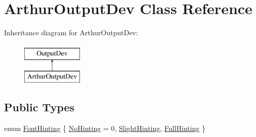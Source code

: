 \hypertarget{class_arthur_output_dev}{}\section{Arthur\+Output\+Dev Class Reference}
\label{class_arthur_output_dev}
Inheritance diagram for Arthur\+Output\+Dev\+:\begin{figure}[H]
\begin{center}
\leavevmode
\includegraphics[height=2.000000cm]{class_arthur_output_dev}
\end{center}
\end{figure}
\subsection*{Public Types}
\begin{DoxyCompactItemize}
\item 
enum \hyperlink{class_arthur_output_dev_adf1c06826670a14bb7199333c90c1a3b}{Font\+Hinting} \{ \hyperlink{class_arthur_output_dev_adf1c06826670a14bb7199333c90c1a3baea63a6c84b3dc203fbd150ebc26595d4}{No\+Hinting} = 0, 
\hyperlink{class_arthur_output_dev_adf1c06826670a14bb7199333c90c1a3baa873f8fd7197f9e7ed98d3183f360ff2}{Slight\+Hinting}, 
\hyperlink{class_arthur_output_dev_adf1c06826670a14bb7199333c90c1a3ba56c7943ee3ca37948b61d34c8e549178}{Full\+Hinting}
 \}
\end{DoxyCompactItemize}
